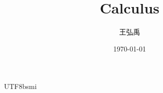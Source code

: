 \documentclass[12pt, a4paper]{article}
\title{\textbf{Calculus}}
\author{王弘禹}
\date\today
\begin{document}
\begin{CJK*}{UTF8}{bsmi}
\linespread{1.5}
\maketitle
\newcommand{\st}[1]{\section*{#1}}
\newcommand{\sst}[1]{\subsection*{#1}}
\newcommand{\ssst}[1]{\subsubsection*{#1}}
\newcommand{\dsp}{\displaystyle}
\newcommand{\dx}{\,dx}
\newcommand{\dphi}{\,d\phi}
\newcommand{\dtheta}{\,d\theta}
\newcommand{\dy}{\,dy}
\newcommand{\dz}{\,dz}
\newcommand{\dr}{\,dr}
\newcommand{\drho}{\,d\rho}

\end{CJK*}
\end{document}
